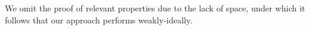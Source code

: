 {{%
We omit the proof of relevant properties due to the lack of space, under which it follows that our approach performs weakly-ideally.

}}
